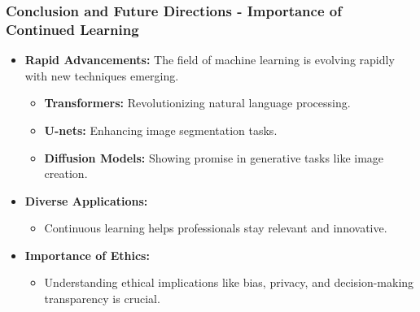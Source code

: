 \documentclass[aspectratio=169]{beamer}
\begin{document}
\begin{frame}[fragile]
    \frametitle{Conclusion and Future Directions - Importance of Continued Learning}
    \begin{itemize}
        \item \textbf{Rapid Advancements:} The field of machine learning is evolving rapidly with new techniques emerging.
        \begin{itemize}
            \item \textbf{Transformers:} Revolutionizing natural language processing.
            \item \textbf{U-nets:} Enhancing image segmentation tasks.
            \item \textbf{Diffusion Models:} Showing promise in generative tasks like image creation.
        \end{itemize}
        
        \item \textbf{Diverse Applications:} 
        \begin{itemize}
            \item Continuous learning helps professionals stay relevant and innovative.
        \end{itemize}
        
        \item \textbf{Importance of Ethics:} 
        \begin{itemize}
            \item Understanding ethical implications like bias, privacy, and decision-making transparency is crucial.
        \end{itemize}
    \end{itemize}
\end{frame}
\end{document}
